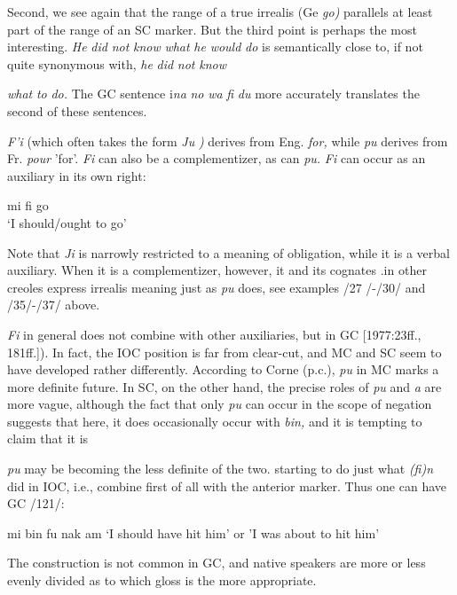 Second, we see again that the range of a true irrealis (Ge \textit{go}\textit{)} parallels at least part of the range of an SC marker. But the third point is perhaps the most interesting. \textit{He }\textit{did} \textit{not} \textit{know} \textit{what} \textit{he} \textit{would} \textit{do }is semantically close to, if not quite synonymous with, \textit{he} \textit{did} \textit{not} \textit{know}

\textit{what} \textit{to} \textit{do.} The GC sentence i\textit{na} \textit{no} \textit{wa} \textit{fi} \textit{du} more accurately translates the second of these sentences.

\textit{F'i} (which often takes the form \textit{Ju} \textit{)} derives from Eng. \textit{for,} while \textit{pu} derives from Fr. \textit{pour} 'for'. \textit{Fi} can also be a complementizer, as can \textit{pu.} \textit{Fi} can occur as an auxiliary in its own right:


\ea\label{ex:2:120}
mi fi go\\
\glt `I should/ought to go'
\z


Note that \textit{Ji} is narrowly restricted to a meaning of obligation, while it is a verbal auxiliary. When it is a complementizer, however, it and its cognates .in other creoles express irrealis meaning just as \textit{pu} does, see examples /27 /-/30/ and /35/-/37/ above.

\textit{Fi} in general does not combine with other auxiliaries, but in GC
[1977:23ff., 181ff.]). In fact, the IOC position is far from clear-cut, and MC and SC seem to have developed rather differently. According to Corne (p.c.), \textit{pu} in MC marks a more definite future. In SC, on the other hand, the precise roles of \textit{pu} and \textit{a }are more vague, although the fact that only \textit{pu} can occur in the scope of negation suggests that here,
it does occasionally occur with \textit{bin,} and it is tempting to claim that it is

\textit{pu} may be becoming the less definite of the two.
starting to do just what \textit{(fi)n} did in IOC, i.e., combine first of all with the anterior marker. Thus one can have GC /121/:

\ea\label{ex:2:121}
 mi bin fu nak am
\glt `I should have hit him' or 'I was about to hit him'
\z



The construction is not common in GC, and native speakers are more or less evenly divided as to which gloss is the more appropriate.

